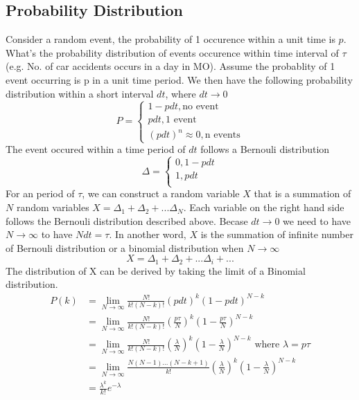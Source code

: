 \documentclass[12pt, oneside]{article}
\begin{document}
\subsection{Probability Distribution}
Consider a random event, the probability of 1 occurence within a unit time is $p$. What's the probability distribution of events occurence within time interval of $\tau$ (e.g. No. of car accidents occurs in a day in MO). 
Assume the probablity of 1 event occurring is p in a unit time period. We then have the following probability distribution within a short interval $dt$, where $dt\rightarrow 0$
\begin{equation*}
P=
\begin{cases}
1-pdt, \text{no event}\\
pdt, \text{1 event}\\
(pdt)^n\approx 0, \text{n events}
\end{cases}
\end{equation*}
The event occured within a time period of $dt$ follows a Bernouli distribution
\begin{equation*}
{\Delta}=
\begin{cases}
0, 1-pdt\\
1, pdt\\
\end{cases}
\end{equation*}
For an period of $\tau$, we can construct a random variable $X$ that is a summation of $N$ random variables $X=\Delta_1+\Delta_2+...\Delta_N$. Each variable on the right hand side follows the Bernouli distribution described above. Becase $dt \rightarrow 0$ we need to have $N\rightarrow \infty$ to have $Ndt=\tau$. In another word, $X$ is the summation of infinite number of Bernouli distribution or a binomial distribution when $N\rightarrow \infty$
$$X=\Delta_1+\Delta_2+...\Delta_i+...$$
The distribution of X can be derived by taking the limit of a Binomial distribution.
\begin{align*}
P(k)&=\lim_{N \rightarrow \infty}\frac{N!}{k!(N-k)!}(pdt)^k(1-pdt)^{N-k}\\
&=\lim_{N \rightarrow \infty}\frac{N!}{k!(N-k)!}(\frac{p\tau}{N})^k(1-\frac{p\tau}{N})^{N-k}\\
&=\lim_{N \rightarrow \infty}\frac{N!}{k!(N-k)!}(\frac{\lambda}{N})^k(1-\frac{\lambda}{N})^{N-k} \text{ where } \lambda=p\tau\\
&=\lim_{N \rightarrow \infty}\frac{N(N-1)...(N-k+1)}{k!}(\frac{\lambda}{N})^k(1-\frac{\lambda}{N})^{N-k}\\
&=\frac{\lambda^k}{k!}e^{-\lambda}
\end{align*}
\end{document}
